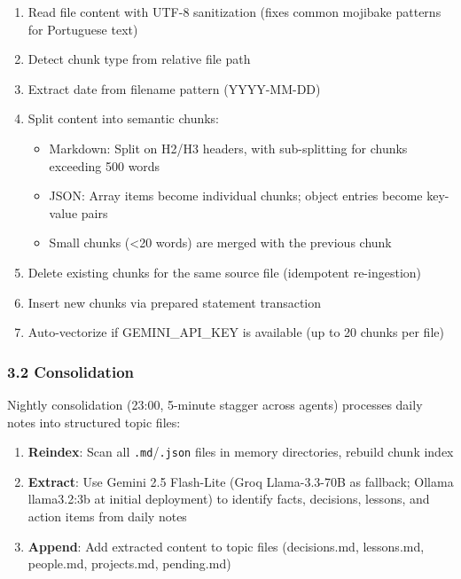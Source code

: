 \documentclass[
]{article}
\providecommand{\tightlist}{%
  \setlength{\itemsep}{0pt}\setlength{\parskip}{0pt}}
\begin{document}
\begin{enumerate}
\def\labelenumi{\arabic{enumi}.}
\tightlist
\item
  Read file content with UTF-8 sanitization (fixes common mojibake
  patterns for Portuguese text)
\item
  Detect chunk type from relative file path
\item
  Extract date from filename pattern (YYYY-MM-DD)
\item
  Split content into semantic chunks:

  \begin{itemize}
  \tightlist
  \item
    Markdown: Split on H2/H3 headers, with sub-splitting for chunks
    exceeding 500 words
  \item
    JSON: Array items become individual chunks; object entries become
    key-value pairs
  \item
    Small chunks (\textless20 words) are merged with the previous chunk
  \end{itemize}
\item
  Delete existing chunks for the same source file (idempotent
  re-ingestion)
\item
  Insert new chunks via prepared statement transaction
\item
  Auto-vectorize if GEMINI\_API\_KEY is available (up to 20 chunks per
  file)
\end{enumerate}

\subsubsection{3.2 Consolidation}\label{consolidation}

Nightly consolidation (23:00, 5-minute stagger across agents) processes
daily notes into structured topic files:

\begin{enumerate}
\def\labelenumi{\arabic{enumi}.}
\tightlist
\item
  \textbf{Reindex}: Scan all \texttt{.md}/\texttt{.json} files in memory
  directories, rebuild chunk index
\item
  \textbf{Extract}: Use Gemini 2.5 Flash-Lite (Groq Llama-3.3-70B as
  fallback; Ollama llama3.2:3b at initial deployment) to identify facts,
  decisions, lessons, and action items from daily notes
\item
  \textbf{Append}: Add extracted content to topic files (decisions.md,
  lessons.md, people.md, projects.md, pending.md)
\end{enumerate}
\end{document}
